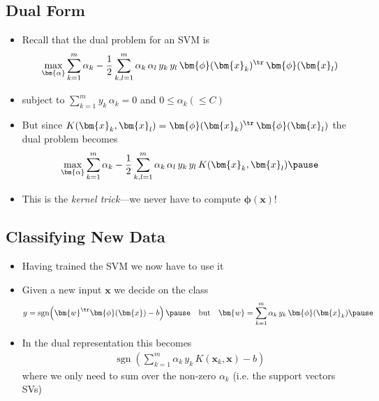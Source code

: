 \begin{slide}
\section[-2]{Dual Form}

\begin{PauseHighLight}
  \begin{itemize}
  \item Recall that the dual problem for an SVM is
    \begin{align*}
      \max_{\bm{\alpha}} \sum_{k=1}^m \alpha_k - \frac{1}{2}
      \sum_{k,l=1}^m \alpha_k\,\alpha_l\, y_k\,y_l\,
      \bm{\phi}(\bm{x}_k)^\tr\,\bm{\phi}(\bm{x}_l)
    \end{align*}
  \item subject to $\sum\limits_{k=1}^m y_k\,\alpha_k=0$ and $0\leq \alpha_k (\leq C)$\pause
  \item But since $K(\bm{x}_k,\bm{x}_l) =
    \bm{\phi}(\bm{x}_k)^\tr\,\bm{\phi}(\bm{x}_l)$ the dual problem
    becomes
    \begin{align*}
      \max_{\bm{\alpha}} \sum_{k=1}^m \alpha_k - \frac{1}{2}
      \sum_{k,l=1}^m \alpha_k\,\alpha_l\, y_k\,y_l\,K(\bm{x}_k,\bm{x}_l)\pause
    \end{align*}
  \item This is the \emph{kernel trick}\pause---we never have to
    compute $\bm{\phi}(\bm{x})$!\pauseb
  \end{itemize}
\end{PauseHighLight}


\end{slide}



\begin{slide}
\section[-2]{Classifying New Data}

\begin{PauseHighLight}
  \begin{itemize}
  \item Having trained the SVM we now have to use it\pause
  \item Given a new input $\bm{x}$ we decide on the class
    \begin{align*}
      &y=\mathrm{\mathop{sgn}}\!\left(\bm{w}^\tr\bm{\phi}(\bm{x})-b\right)\pause
        & \text{but}&& \bm{w} = \sum_{k=1}^m
    \alpha_k\,y_k \, \bm{\phi}(\bm{x}_k)\pause
    \end{align*}
  \item In the dual representation this becomes
    \begin{align*}
      \mathrm{\mathop{sgn}}\!\left(\sum_{k=1}^m \alpha_k\, y_k \,
      K(\bm{x}_k,\bm{x})-b\right)
    \end{align*}
    where we only need to sum over the non-zero $\alpha_k$ (i.e. the
    support vectors SVs)\pause
  \end{itemize}
\end{PauseHighLight}

\end{slide}

